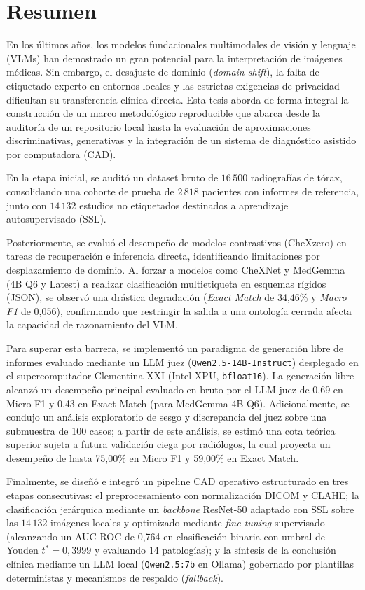 \documentclass[../tesis.tex]{subfiles}
\begin{document}
\chapter*{Resumen}

En los últimos años, los modelos fundacionales multimodales de visión y lenguaje (VLMs) han demostrado un gran potencial para la interpretación de imágenes médicas. Sin embargo, el desajuste de dominio (\textit{domain shift}), la falta de etiquetado experto en entornos locales y las estrictas exigencias de privacidad dificultan su transferencia clínica directa. Esta tesis aborda de forma integral la construcción de un marco metodológico reproducible que abarca desde la auditoría de un repositorio local hasta la evaluación de aproximaciones discriminativas, generativas y la integración de un sistema de diagnóstico asistido por computadora (CAD).

En la etapa inicial, se auditó un dataset bruto de $16\,500$ radiografías de tórax, consolidando una cohorte de prueba de $2\,818$ pacientes con informes de referencia, junto con $14\,132$ estudios no etiquetados destinados a aprendizaje autosupervisado (SSL).

Posteriormente, se evaluó el desempeño de modelos contrastivos (CheXzero) en tareas de recuperación e inferencia directa, identificando limitaciones por desplazamiento de dominio. Al forzar a modelos como CheXNet y MedGemma (4B Q6 y Latest) a realizar clasificación multietiqueta en esquemas rígidos (JSON), se observó una drástica degradación (\textit{Exact Match} de 34,46\% y \textit{Macro F1} de 0,056), confirmando que restringir la salida a una ontología cerrada afecta la capacidad de razonamiento del VLM.

Para superar esta barrera, se implementó un paradigma de generación libre de informes evaluado mediante un LLM juez (\texttt{Qwen2.5-14B-Instruct}) desplegado en el supercomputador Clementina XXI (Intel XPU, \texttt{bfloat16}). La generación libre alcanzó un desempeño principal evaluado en bruto por el LLM juez de 0,69 en Micro F1 y 0,43 en Exact Match (para MedGemma 4B Q6). Adicionalmente, se condujo un análisis exploratorio de sesgo y discrepancia del juez sobre una submuestra de 100 casos; a partir de este análisis, se estimó una cota teórica superior sujeta a futura validación ciega por radiólogos, la cual proyecta un desempeño de hasta 75,00\% en Micro F1 y 59,00\% en Exact Match.

Finalmente, se diseñó e integró un pipeline CAD operativo estructurado en tres etapas consecutivas: el preprocesamiento con normalización DICOM y CLAHE; la clasificación jerárquica mediante un \textit{backbone} ResNet-50 adaptado con SSL sobre las $14\,132$ imágenes locales y optimizado mediante \textit{fine-tuning} supervisado (alcanzando un AUC-ROC de 0,764 en clasificación binaria con umbral de Youden $t^*=0{,}3999$ y evaluando 14 patologías); y la síntesis de la conclusión clínica mediante un LLM local (\texttt{Qwen2.5:7b} en Ollama) gobernado por plantillas deterministas y mecanismos de respaldo (\textit{fallback}).
\end{document}
